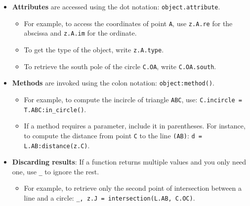 \begin{itemize}
  \item \textbf{Attributes} are accessed using the dot notation: \verb|object.attribute|.
    \begin{itemize}
      \item For example, to access the coordinates of point \verb|A|, use \verb|z.A.re| for the abscissa and \verb|z.A.im| for the ordinate.
      \item To get the type of the object, write \verb|z.A.type|.
      \item To retrieve the south pole of the circle \verb|C.OA|, write \verb|C.OA.south|.
    \end{itemize}

  \item \textbf{Methods} are invoked using the colon notation: \verb|object:method()|.
    \begin{itemize}
      \item For example, to compute the incircle of triangle \verb|ABC|, use: \verb|C.incircle = T.ABC:in_circle()|.
      \item If a method requires a parameter, include it in parentheses. For instance, to compute the distance from point \verb|C| to the line \verb|(AB)|: \verb|d = L.AB:distance(z.C)|.
    \end{itemize}

  \item \textbf{Discarding results}: If a function returns multiple values and you only need one, use \verb|_| to ignore the rest.
    \begin{itemize}
      \item For example, to retrieve only the second point of intersection between a line and a circle: \verb|_, z.J = intersection(L.AB, C.OC)|.
    \end{itemize}
\end{itemize}


